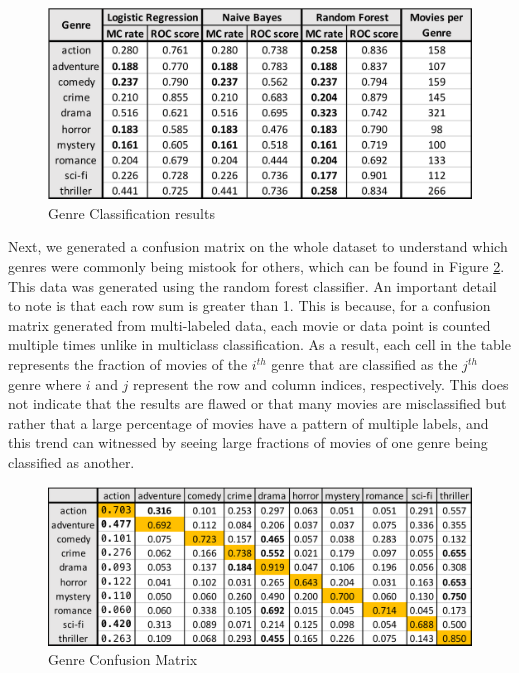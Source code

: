 \documentclass{article} %
\begin{document}
\begin{figure}[htb]
\centering
\includegraphics[width=0.8\linewidth]{genre} 
\caption{Genre Classification results}
\label{genre_data}
\end{figure}

Next, we generated a confusion matrix on the whole dataset to understand which genres were commonly being mistook for others, which can be found in Figure \ref{confusion_data}. This data was generated using the random forest classifier. An important detail to note is that each row sum is greater than 1. This is because, for a confusion matrix generated from multi-labeled data, each movie or data point is counted multiple times unlike in multiclass classification. As a result, each cell in the table represents the fraction of movies of the $i^{th}$ genre that are classified as the $j^{th}$ genre where $i$ and $j$ represent the row and column indices, respectively. This does not indicate that the results are flawed or that many movies are misclassified but rather that a large percentage of movies have a pattern of multiple labels, and this trend can witnessed by seeing large fractions of movies of one genre being classified as another.

\begin{figure}[htb]
\centering
\includegraphics[width=0.8\linewidth]{confusion} 
\caption{Genre Confusion Matrix}
\label{confusion_data}
\end{figure}
\end{document}
